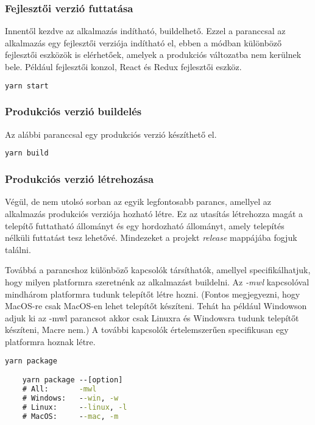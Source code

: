 \subsubsection{Fejlesztői verzió futtatása}
Innentől kezdve az alkalmazás indítható, buildelhető. Ezzel a paranccsal az alkalmazás egy fejlesztői verziója indítható el, ebben a módban különböző fejlesztői eszközök is elérhetőek, amelyek a produkciós változatba nem kerülnek bele. Például fejlesztői konzol, React és Redux fejlesztői eszköz.
\begin{lstlisting}[language={cmd}, numbers={none}]
    yarn start
\end{lstlisting}

\subsubsection{Produkciós verzió buildelés}
Az alábbi paranccsal egy produkciós verzió készíthető el.
\begin{lstlisting}[language={cmd}, numbers={none}]
    yarn build
\end{lstlisting}

\cleardoublepage
\subsubsection{Produkciós verzió létrehozása}
Végül, de nem utolsó sorban az egyik legfontosabb parancs, amellyel az alkalmazás produkciós verziója hozható létre. Ez az utasítás létrehozza magát a telepítő futtatható állományt és egy hordozható állományt, amely telepítés nélküli futtatást tesz lehetővé. Mindezeket a projekt {\it release} mappájába fogjuk találni.

Továbbá a parancshoz különböző kapcsolók társíthatók, amellyel specifikálhatjuk, hogy milyen platformra szeretnénk az alkalmazást buildelni. Az {\it -mwl} kapcsolóval mindhárom platformra tudunk telepítőt létre hozni. (Fontos megjegyezni, hogy MacOS-re csak MacOS-en lehet telepítőt készíteni. Tehát ha például Windowson adjuk ki az -mwl parancsot akkor csak Linuxra és Windowsra tudunk telepítőt készíteni, Macre nem.) A további kapcsolók értelemszerűen specifikusan egy platformra hoznak létre.
\begin{lstlisting}[language={cmd}, numbers={none}]
    yarn package

    yarn package --[option]
    # All:       -mwl
    # Windows:   --win, -w
    # Linux:     --linux, -l
    # MacOS:     --mac, -m
\end{lstlisting}

